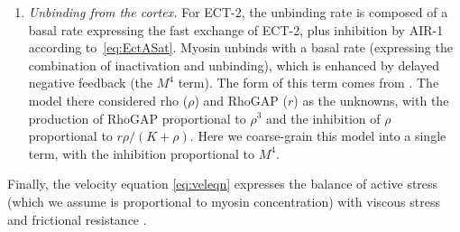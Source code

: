 \documentclass[11pt]{article}
\begin{document}
\begin{appendix}
\begin{enumerate}
\item \emph{Unbinding from the cortex.} For ECT-2, the unbinding rate is composed of a basal rate expressing the fast exchange of ECT-2, plus inhibition by AIR-1 according to\ \eqref{eq:EctASat}. Myosin unbinds with a basal rate (expressing the combination of inactivation and unbinding), which is enhanced by delayed negative feedback (the $M^4$ term). The form of this term comes from \cite{michaux2018excitable}. The model there considered rho ($\rho$) and RhoGAP ($r$) as the unknowns, with the production of RhoGAP proportional to $\rho^3$ and the inhibition of $\rho$ proportional to $r \rho/(K+\rho)$. Here we coarse-grain this model into a single term, with the inhibition proportional to $M^4$. 
\end{enumerate}
Finally, the velocity equation \eqref{eq:veleqn} expresses the balance of active stress (which we assume is proportional to myosin concentration) with viscous stress and frictional resistance \cite{mayer2010anisotropies}. 


\end{appendix}
\end{document}

